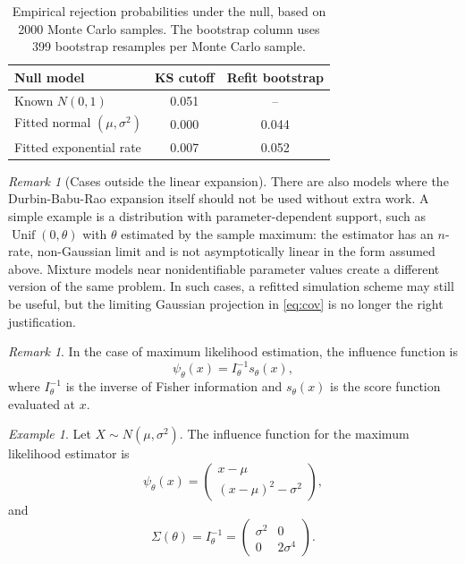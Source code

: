 \documentclass[preprint,12pt]{elsarticle}
\theoremstyle{plain}
\theoremstyle{remark}
\newtheorem{remark}[theorem]{Remark}
\newtheorem*{example}{Example}
\begin{document}
\begin{table}[!htbp]
\centering
\small
\caption{Empirical rejection probabilities under the null, based on 2000 Monte
Carlo samples. The bootstrap column uses 399 bootstrap resamples per Monte Carlo
sample.}
\label{tab:composite-null}
\begin{tabular}{@{}lcc@{}}
\toprule
Null model & KS cutoff & Refit bootstrap\\
\midrule
Known $N(0,1)$ & 0.051 & --\\
Fitted normal $(\mu,\sigma^2)$ & 0.000 & 0.044\\
Fitted exponential rate & 0.007 & 0.052\\
\bottomrule
\end{tabular}
\end{table}

\begin{remark}[Cases outside the linear expansion]
There are also models where the Durbin-Babu-Rao expansion itself should not be
used without extra work. A simple example is a distribution with parameter-dependent
support, such as $\operatorname{Unif}(0,\theta)$ with $\theta$
estimated by the sample maximum: the estimator has an $n$-rate, non-Gaussian
limit and is not asymptotically linear in the form assumed above. Mixture
models near nonidentifiable parameter values create a different version of the
same problem. In such cases, a refitted simulation scheme may still be useful,
but the limiting Gaussian projection in \eqref{eq:cov} is no longer the right
justification.
\end{remark}

\begin{remark}
In the case of maximum likelihood estimation, the influence function is
\[
\psi_\theta(x)=I^{-1}_\theta s_\theta(x),
\]
where $I^{-1}_\theta$ is the inverse of Fisher information and $s_\theta(x)$ is the score function evaluated at $x$.
\end{remark}


\begin{example}
Let $X\sim N(\mu,\sigma^2)$. The influence function for the maximum likelihood estimator is
\[
\psi_\theta(x)=
\begin{pmatrix}
    x-\mu\\
    (x-\mu)^2-\sigma^2
\end{pmatrix},
\]
and
\[
\Sigma(\theta)=I_\theta^{-1}=
\begin{pmatrix}
    \sigma^2 & 0\\
    0 & 2\sigma^{4}
\end{pmatrix}.
\]
\end{example}
\end{document}
